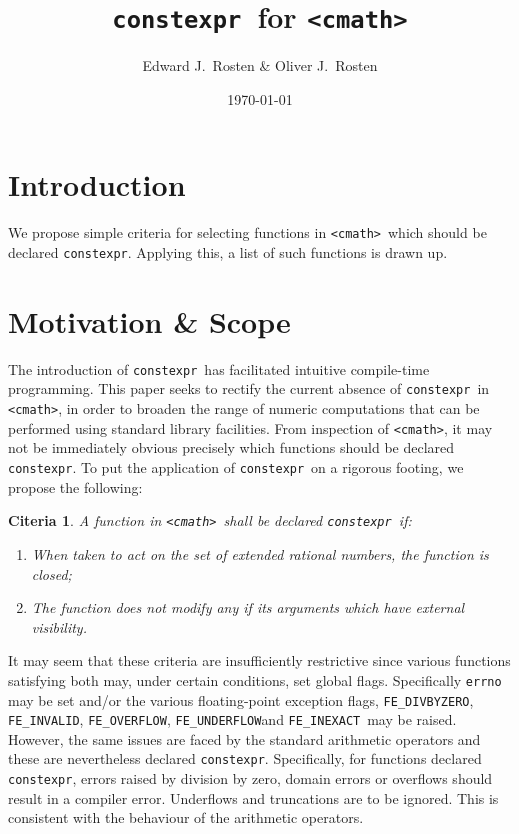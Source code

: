 \documentclass[prd,preprint,amsmath,amssymb,nofootinbib,eqsecnum]{revtex4-1}
\newcommand{\code}[1]{{\tt #1}}
\newcommand{\constexpr}{\code{constexpr}}
\newcommand{\header}[1]{{\tt <#1>}}
\newcommand{\cmath}{\header{cmath}}
\newcommand{\FEINVALID}{{\tt FE\_INVALID}}
\newcommand{\FEDIVBYZERO}{{\tt FE\_DIVBYZERO}}
\newcommand{\FEINEXACT}{{\tt FE\_INEXACT}}
\newcommand{\FEUNDERFLOW}{{\tt FE\_UNDERFLOW}}
\newcommand{\FEOVERFLOW}{{\tt FE\_OVERFLOW}}
\newtheorem{criteria}{Citeria}
\begin{document}
\title{\constexpr\ for \cmath}
\author{Edward J.~Rosten \& Oliver J.~Rosten}
\date{\today}
\maketitle

\section{Introduction}

We propose simple criteria for selecting functions in \cmath\ which should be declared \constexpr. Applying this, a list of such functions is drawn up.

\section{Motivation \& Scope}

The introduction of \constexpr\ has facilitated intuitive compile-time programming. This paper seeks to rectify the current absence of \constexpr\ in \cmath, in order to broaden the range of numeric computations that can be performed using standard library facilities. From inspection of \cmath, it may not be immediately obvious precisely which functions should be declared \constexpr. To put the application of \constexpr\ on a rigorous footing, we propose the following:
\begin{criteria}
	A function in \cmath\ shall be declared \constexpr\ if:
	\begin{enumerate}
		\item When taken to act on the set of extended rational numbers, the function is closed;
		
		\item The function does not modify any if its arguments which have external visibility.
	\end{enumerate}
\label{cri:rational}	
\end{criteria}

It may seem that these criteria are insufficiently restrictive since various functions satisfying both may, under certain conditions, set global flags. Specifically \code{errno} may be set and/or the various floating-point exception flags, \FEDIVBYZERO, \FEINVALID, \FEOVERFLOW, \FEUNDERFLOW and \FEINEXACT\ may be raised. However, the same issues are faced by the standard arithmetic operators and these are nevertheless declared \constexpr. Specifically, for functions declared \constexpr, errors raised by division by zero, domain errors or overflows should result in a compiler error. Underflows and truncations are to be ignored. This is consistent with the behaviour of the arithmetic operators.
\end{document}

